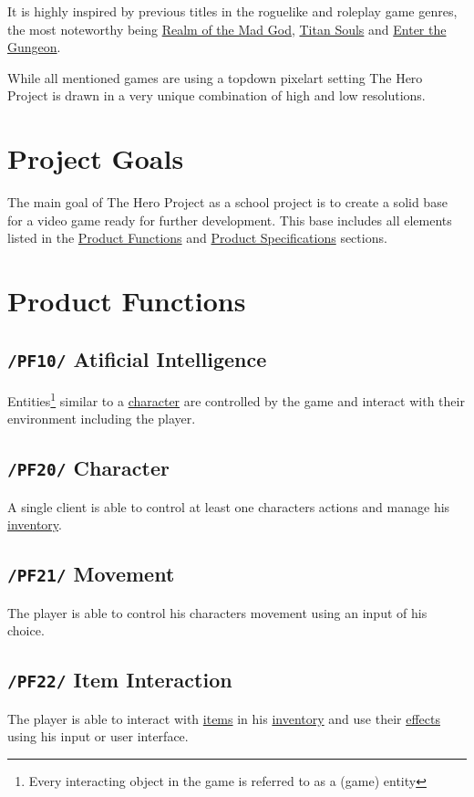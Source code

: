 \documentclass[11pt]{article}
\begin{document}
It is highly inspired by previous titles in the roguelike and roleplay game genres, the most noteworthy being \href{https://realmofthemadgod.com}{Realm of the Mad God}, \href{http://www.devolverdigital.com/games/view/titan-souls}{Titan Souls} and \href{http://dodgeroll.com/gungeon/}{Enter the Gungeon}.

While all mentioned games are using a topdown pixelart setting The Hero Project is drawn in a very unique combination of high and low resolutions.

\section{Project Goals}
The main goal of The Hero Project as a school project is to create a solid base for a video game ready for further development.
This base includes all elements listed in the \hyperref[sec:pf]{Product Functions} and \hyperref[sec:ps]{Product Specifications} sections.

\newpage

\section{Product Functions}\label{sec:pf}
\subsection{\texttt{/PF10/} Atificial Intelligence}\label{subsec:pf10ai}
Entities\footnote{Every interacting object in the game is referred to as a (game) entity} similar to a \hyperref[subsec:pf20character]{character} are controlled by the game and interact with their environment including the player.
\subsection{\texttt{/PF20/} Character}\label{subsec:pf20character}
A single client is able to control at least one characters actions and manage his \hyperref[subsec:pf41inventory]{inventory}.
\subsection{\texttt{/PF21/} Movement}\label{subsec:pf21movement}
The player is able to control his characters movement using an input of his choice.
\subsection{\texttt{/PF22/} Item Interaction}\label{subsec:pf22iteminteraction}
The player is able to interact with \hyperref[subsec:pf40items]{items} in his \hyperref[subsec:pf41inventory]{inventory} and use their \hyperref[subsec:pf30effects]{effects} using his input or user interface.
\end{document}
